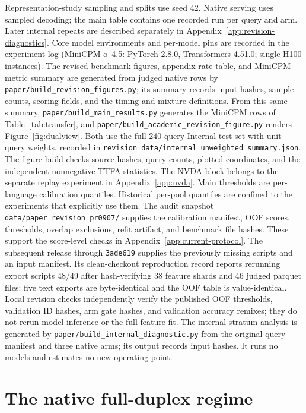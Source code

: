 Representation-study sampling and splits use seed 42. Native serving
uses sampled decoding; the main table contains one recorded run per
query and arm. Later internal repeats are described separately in
Appendix~\ref{app:revision-diagnostics}. Core model environments and
per-model pins are recorded in the experiment log (MiniCPM-o~4.5:
PyTorch 2.8.0, Transformers 4.51.0; single-H100 instances).
The revised benchmark figures, appendix rate table, and MiniCPM
metric summary are generated from judged native rows by \texttt{paper/build\_revision\_figures.py}; its summary
records input hashes, sample counts, scoring fields, and the timing
and mixture definitions. From this same summary,
\texttt{paper/build\_main\_results.py} generates the MiniCPM rows of
Table~\ref{tab:transfer}, and
\texttt{paper/build\_academic\_revision\_figure.py} renders
Figure~\ref{fig:dualview}. Both use the full 240-query Internal test set
with unit query weights, recorded in
\texttt{revision\_data/internal\_unweighted\_summary.json}.
The figure build checks source hashes, query counts, plotted coordinates,
and the independent nonnegative TTFA statistics.
The NVDA block belongs to the separate replay experiment in
Appendix~\ref{app:nvda}. Main thresholds are per-language calibration
quantiles. Historical per-pool quantiles are confined to the experiments
that explicitly use them. The audit snapshot
\texttt{data/paper\_revision\_pr0907/} supplies the calibration manifest,
OOF scores, thresholds, overlap exclusions, refit artifact, and
benchmark file hashes. These support the score-level checks in
Appendix~\ref{app:current-protocol}. The subsequent release through
\texttt{3ade619} supplies the previously missing scripts and an input
manifest. Its clean-checkout reproduction record reports rerunning
export scripts 48/49 after hash-verifying 38 feature shards and 46
judged parquet files: five text exports are byte-identical and the OOF
table is value-identical. Local revision checks independently verify
the published OOF thresholds, validation ID hashes, arm gate hashes,
and validation accuracy remixes; they do not rerun model inference or
the full feature fit. The internal-stratum analysis is
generated by \texttt{paper/build\_internal\_diagnostic.py} from the
original query manifest and three native arms; its output records
input hashes. It runs no models and estimates no new operating point.

\section{The native full-duplex regime}
\label{app:native}

